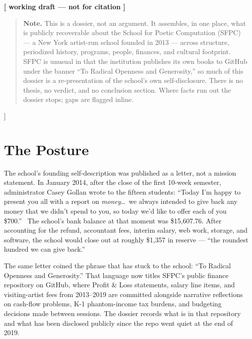 \documentclass[10pt,letterpaper,twocolumn]{article}
\begin{document}
{\begin{center}
{\small\color{acpink}\textbf{[ working draft --- not for citation ]}}
\end{center}
\vspace{0.3em}

\begin{quote}
\small\noindent\textbf{Note.} This is a dossier, not an argument. It assembles, in one place, what is publicly recoverable about the School for Poetic Computation (SFPC) --- a New York artist-run school founded in 2013 --- across structure, periodized history, programs, people, finances, and cultural footprint. SFPC is unusual in that the institution publishes its own books to GitHub under the banner ``To Radical Openness and Generosity,'' so much of this dossier is a re-presentation of the school's own self-disclosure. There is no thesis, no verdict, and no conclusion section. Where facts run out the dossier stops; gaps are flagged inline.
\end{quote}
\vspace{0.5em}
}]

\section{The Posture}

The school's founding self-description was published as a letter, not a mission statement. In January 2014, after the close of the first 10-week semester, administrator Casey Gollan wrote to the fifteen students: ``Today I'm happy to present you all with a report on \emph{money}\ldots\ we always intended to give back any money that we didn't spend to you, so today we'd like to offer each of you \$700.''~\citep{sfpc01report} The school's bank balance at that moment was \$15,607.76. After accounting for the refund, accountant fees, interim salary, web work, storage, and software, the school would close out at roughly \$1,357 in reserve --- ``the roundest hundred we can give back.''

The same letter coined the phrase that has stuck to the school: ``To Radical Openness and Generosity.'' That language now titles SFPC's public finance repository on GitHub, where Profit \& Loss statements, salary line items, and visiting-artist fees from 2013--2019 are committed alongside narrative reflections on cash-flow problems, K-1 phantom-income tax burdens, and budgeting decisions made between sessions. The dossier records what is in that repository and what has been disclosed publicly since the repo went quiet at the end of 2019.
\end{document}
